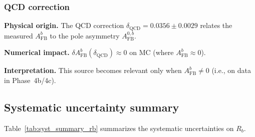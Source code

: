 \documentclass[11pt,a4paper]{article}
\begin{document}
\subsubsection{QCD correction}
\label{sec:syst_qcd}

\textbf{Physical origin.} The QCD correction $\delta_\mathrm{QCD} = 0.0356 \pm 0.0029$
relates the measured $A_\mathrm{FB}^b$ to the pole asymmetry $A_\mathrm{FB}^{0,b}$.

\textbf{Numerical impact.}
$\delta A_\mathrm{FB}^b(\delta_\mathrm{QCD}) \approx 0$ on MC (where $A_\mathrm{FB}^b \approx 0$).

\textbf{Interpretation.} This source becomes relevant only when $A_\mathrm{FB}^b \neq 0$
(i.e., on data in Phase~4b/4c).

\subsection{Systematic uncertainty summary}
\label{sec:syst_summary}

Table~\ref{tab:syst_summary_rb} summarizes the systematic uncertainties on $R_b$.
\end{document}
